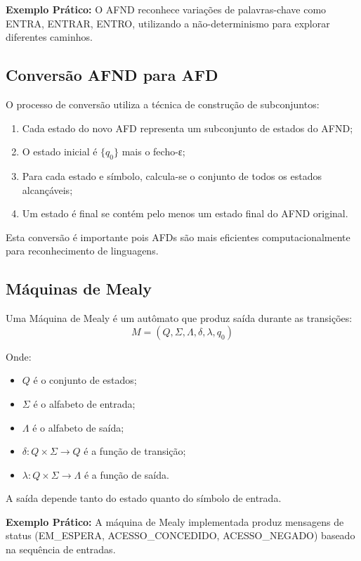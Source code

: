 \documentclass[12pt,a4paper]{article}
\begin{document}
\textbf{Exemplo Prático:} O AFND reconhece variações de palavras-chave como ENTRA, ENTRAR, ENTRO, utilizando a não-determinismo para explorar diferentes caminhos.

\subsection{Conversão AFND para AFD}

O processo de conversão utiliza a técnica de construção de subconjuntos:

\begin{enumerate}
    \item Cada estado do novo AFD representa um subconjunto de estados do AFND;
    \item O estado inicial é $\{q_0\}$ mais o fecho-ε;
    \item Para cada estado e símbolo, calcula-se o conjunto de todos os estados alcançáveis;
    \item Um estado é final se contém pelo menos um estado final do AFND original.
\end{enumerate}

Esta conversão é importante pois AFDs são mais eficientes computacionalmente para reconhecimento de linguagens.

\subsection{Máquinas de Mealy}

Uma Máquina de Mealy é um autômato que produz saída durante as transições:
\[ M = (Q, \Sigma, \Lambda, \delta, \lambda, q_0) \]

Onde:
\begin{itemize}
    \item $Q$ é o conjunto de estados;
    \item $\Sigma$ é o alfabeto de entrada;
    \item $\Lambda$ é o alfabeto de saída;
    \item $\delta: Q \times \Sigma \rightarrow Q$ é a função de transição;
    \item $\lambda: Q \times \Sigma \rightarrow \Lambda$ é a função de saída.
\end{itemize}

A saída depende tanto do estado quanto do símbolo de entrada.

\textbf{Exemplo Prático:} A máquina de Mealy implementada produz mensagens de status (EM_ESPERA, ACESSO_CONCEDIDO, ACESSO_NEGADO) baseado na sequência de entradas.
\end{document}
